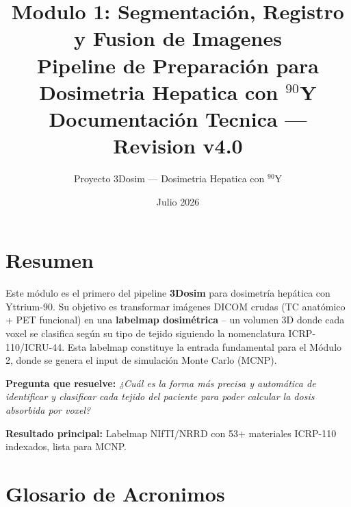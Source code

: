 \documentclass[12pt,a4paper]{article}
\title{\textbf{Modulo 1: Segmentación, Registro y Fusion de Imagenes}\\[0.5cm]
       \large Pipeline de Preparación para Dosimetria Hepatica con $^{90}$Y\\[0.3cm]
       \normalsize Documentación Tecnica --- Revision v4.0}
\author{Proyecto 3Dosim --- Dosimetria Hepatica con $^{90}$Y}
\date{Julio 2026}
\begin{document}
\maketitle
\thispagestyle{empty}
\newpage


\section*{Resumen}

Este módulo es el primero del pipeline \textbf{3Dosim} para dosimetría hepática con Yttrium-90.
Su objetivo es transformar imágenes DICOM crudas (TC anatómico + PET funcional) en una \textbf{labelmap dosimétrica}
-- un volumen 3D donde cada voxel se clasifica según su tipo de tejido siguiendo la nomenclatura ICRP-110/ICRU-44.
Esta labelmap constituye la entrada fundamental para el Módulo 2, donde se genera el input de simulación Monte Carlo (MCNP).

\vspace{0.5em}
\noindent
\textbf{Pregunta que resuelve:} \textit{¿Cuál es la forma más precisa y automática de identificar y clasificar cada tejido del paciente para poder calcular la dosis absorbida por voxel?}

\vspace{0.3em}
\noindent
\textbf{Resultado principal:} Labelmap NIfTI/NRRD con 53+ materiales ICRP-110 indexados, lista para MCNP.



\section*{Glosario de Acronimos}
\end{document}
